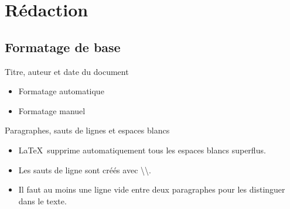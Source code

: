 \section{Rédaction}

\subsection{Formatage de base}

\begin{frame}[fragile]{Titre, auteur et date du document}
	\begin{itemize}
		\item Formatage automatique
		\item Formatage manuel
	\end{itemize}
\end{frame}

\begin{frame}[c]{Paragraphes, sauts de lignes et espaces blancs}
	\begin{itemize}
		\item \LaTeX\ supprime automatiquement tous les espaces blancs superflus.
		\item Les sauts de ligne sont créés avec \textbackslash\textbackslash.
		\item Il faut au moins une ligne vide entre deux paragraphes pour les distinguer dans le texte.
	\end{itemize}
\end{frame}


